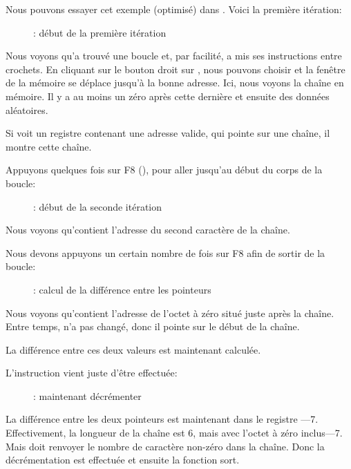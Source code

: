 ﻿\clearpage
{}
\myindex{\olly}

Nous pouvons essayer cet exemple (optimisé) dans \olly. Voici la première itération:

\begin{figure}[H]
\centering
{}
\caption{\olly: début de la première itération}
\label{fig:strlen_olly_1}
\end{figure}

Nous voyons qu'\olly a trouvé une boucle et, par facilité, a mis ses instructions
entre crochets.
En cliquant sur le bouton droit sur \EAX, nous pouvons choisir 
et la fenêtre de la mémoire se déplace jusqu'à la bonne adresse.
Ici, nous voyons la chaîne  en mémoire.
Il y a au moins un zéro après cette dernière et ensuite des données aléatoires.

Si \olly voit un registre contenant une adresse valide, qui pointe sur une chaîne,
il montre cette chaîne.

\clearpage
Appuyons quelques fois sur F8 (\stepover), pour aller jusqu'au début du corps de
la boucle:

\begin{figure}[H]
\centering
{}
\caption{\olly: début de la seconde itération}
\label{fig:strlen_olly_2}
\end{figure}

Nous voyons qu'\EAX contient l'adresse du second caractère de la chaîne.

\clearpage

Nous devons appuyons un certain nombre de fois sur F8 afin de sortir de la boucle:

\begin{figure}[H]
\centering
{}
\caption{\olly: calcul de la différence entre les pointeurs}
\label{fig:strlen_olly_3}
\end{figure}

Nous voyons qu'\EAX contient l'adresse de l'octet à zéro situé juste après la chaîne.
Entre temps, \EDX n'a pas changé, donc il pointe sur le début de la chaîne.

La différence entre ces deux valeurs est maintenant calculée.

\clearpage
L'instruction \SUB vient juste d'être effectuée:

\begin{figure}[H]
\centering
{}
\caption{\olly: maintenant décrémenter \EAX}
\label{fig:strlen_olly_4}
\end{figure}

La différence entre les deux pointeurs est maintenant dans le registre \EAX---7.
Effectivement, la longueur de la chaîne  est 6, mais avec l'octet à zéro
inclus---7.
Mais  doit renvoyer le nombre de caractère non-zéro dans la chaîne.
Donc la décrémentation est effectuée et ensuite la fonction sort.
